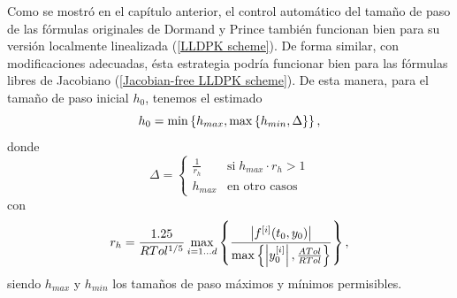 Como se mostró en el capítulo anterior, el control automático del tamaño de paso de las fórmulas originales de Dormand y Prince también funcionan bien para su versión localmente linealizada (\ref{LLDPK scheme}). De forma similar, con modificaciones adecuadas, ésta estrategia podría funcionar bien para las fórmulas libres de Jacobiano (\ref{Jacobian-free LLDPK scheme}). De esta manera, para el tamaño de paso inicial $h_0$, tenemos el estimado
\begin{equation}
    h_0 = \min\left\{  h_{max}, \max\left\{  h_{min} ,\Delta \right\}  \right\}, \label{hcero-fj}
\end{equation}
donde
\begin{equation*}
    \Delta = \begin{cases}
        \frac{1}{r_h} & \text{si} \; h_{max}\cdot r_h>1\\
        h_{max} & \text{en otro casos}
        \end{cases}
\end{equation*}
con
\begin{equation*}
     r_h = \frac{1\mathord{.}25}{RTol^{1/5}}\max_{i=1\ldots d}\left\{\frac{ \left\lvert f^{[i]}(t_0,y_0) \right\rvert }
    {\max\left\{ \left\lvert y^{[i]}_0 \right\rvert ,\frac{ATol}{RTol} \right\}}\right\},
\end{equation*}
siendo $h_{max}$ y $h_{min}$ los tamaños de paso máximos y mínimos permisibles.

